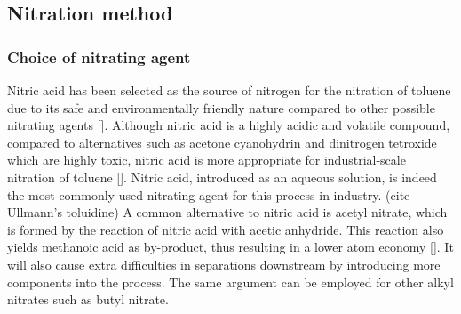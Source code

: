 \subsection{Nitration method}
\subsubsection{Choice of nitrating agent}
Nitric acid has been selected as the source of nitrogen for the nitration of toluene due to its safe and environmentally friendly nature compared to other possible nitrating agents []. Although nitric acid is a highly acidic and volatile compound, compared to alternatives such as acetone cyanohydrin and dinitrogen tetroxide which are highly toxic, nitric acid is more appropriate for industrial-scale nitration of toluene []. Nitric acid, introduced as an aqueous solution, is indeed the most commonly used nitrating agent for this process in industry. (cite Ullmann's toluidine) A common alternative to nitric acid is acetyl nitrate, which is formed by the reaction of nitric acid with acetic anhydride. This reaction also yields methanoic acid as by-product, thus resulting in a lower atom economy []. It will also cause extra difficulties in separations downstream by introducing more components into the process. The same argument can be employed for other alkyl nitrates such as butyl nitrate. 



